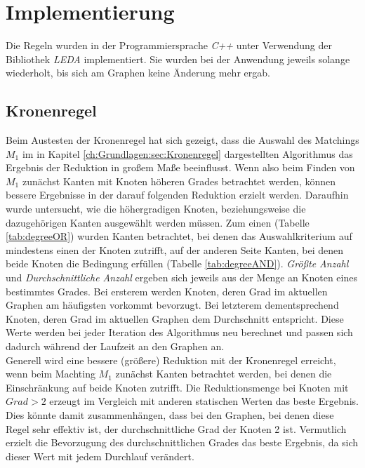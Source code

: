 
\chapter{Implementierung}
\label{ch:Implementierung}


Die Regeln wurden in der Programmiersprache \emph{C++} unter Verwendung der Bibliothek \emph{LEDA} \cite{manual} implementiert. Sie wurden bei der Anwendung jeweils solange wiederholt, bis sich am Graphen keine Änderung mehr ergab. 

\section{Kronenregel}
\label{ch:Implementierung:sec:Kronenregel}

Beim Austesten der Kronenregel hat sich gezeigt, dass die Auswahl des Matchings $M_{1}$ im in Kapitel \ref{ch:Grundlagen:sec:Kronenregel} dargestellten Algorithmus das Ergebnis der Reduktion in großem Maße beeinflusst. Wenn also beim Finden von $M_{1}$ zunächst Kanten mit Knoten höheren Grades betrachtet werden, können bessere Ergebnisse in der darauf folgenden Reduktion erzielt werden. Daraufhin wurde untersucht, wie die höhergradigen Knoten, beziehungsweise die dazugehörigen Kanten ausgewählt werden müssen. Zum einen (Tabelle \ref{tab:degreeOR}) wurden Kanten betrachtet, bei denen das Auswahlkriterium auf mindestens einen der Knoten zutrifft, auf der anderen Seite Kanten, bei denen beide Knoten die Bedingung erfüllen (Tabelle \ref{tab:degreeAND}). \emph{Größte Anzahl} und \emph{Durchschnittliche Anzahl} ergeben sich jeweils aus der Menge an Knoten eines bestimmtes Grades. Bei ersterem werden Knoten, deren Grad im aktuellen Graphen am häufigsten vorkommt bevorzugt. Bei letzterem dementsprechend Knoten, deren Grad im aktuellen Graphen dem Durchschnitt entspricht. Diese Werte werden bei jeder Iteration des Algorithmus neu berechnet und passen sich dadurch während der Laufzeit an den Graphen an.\\ 
Generell wird eine bessere (größere) Reduktion mit der Kronenregel erreicht, wenn beim Machting $M_{1}$ zunächst Kanten betrachtet werden, bei denen die Einschränkung auf beide Knoten zutrifft. Die Reduktionsmenge bei Knoten mit $Grad>2$ erzeugt im Vergleich mit anderen statischen Werten das beste Ergebnis. Dies könnte damit zusammenhängen, dass bei den Graphen, bei denen diese Regel sehr effektiv ist, der durchschnittliche Grad der Knoten 2 ist. Vermutlich erzielt die Bevorzugung des durchschnittlichen Grades das beste Ergebnis, da sich dieser Wert mit jedem Durchlauf verändert.

